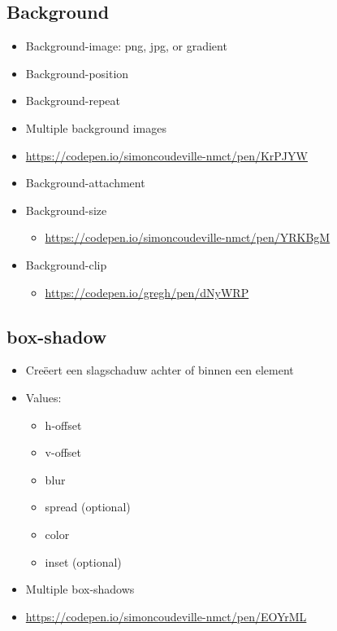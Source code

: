 \documentclass{article}
\begin{document}
\subsection{Background}

\begin{itemize}
    \item Background-image: png, jpg, or gradient
    \item Background-position
    \item Background-repeat
    \item Multiple background images
    \item \url{https://codepen.io/simoncoudeville-nmct/pen/KrPJYW}
    \item Background-attachment
    \item Background-size
    \begin{itemize}
        \item \url{https://codepen.io/simoncoudeville-nmct/pen/YRKBgM}
    \end{itemize}
    \item Background-clip
    \begin{itemize}
        \item \url{https://codepen.io/gregh/pen/dNyWRP}
    \end{itemize}
\end{itemize}

\subsection{box-shadow}

\begin{itemize}
    \item Creëert een slagschaduw achter of binnen een element
    \item Values:
    \begin{itemize}
        \item h-offset
        \item v-offset
        \item blur
        \item spread (optional)
        \item color
        \item inset (optional)
    \end{itemize}
    \item Multiple box-shadows
    \item \url{https://codepen.io/simoncoudeville-nmct/pen/EOYrML}
\end{itemize}
\end{document}
